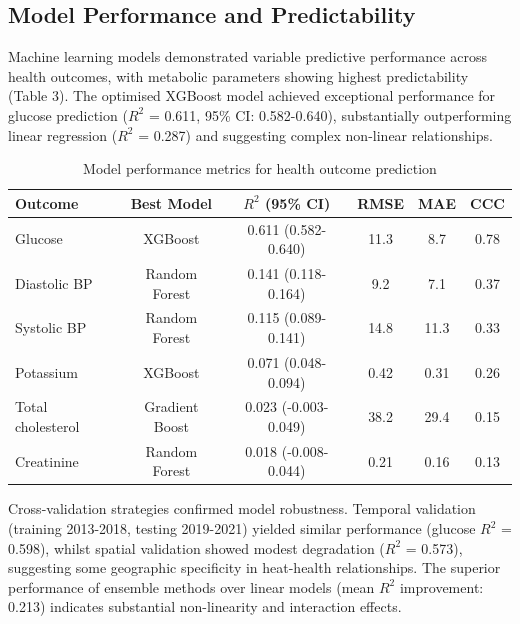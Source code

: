 \documentclass[11pt,a4paper]{article}
\begin{document}
\subsection{Model Performance and Predictability}

Machine learning models demonstrated variable predictive performance across health outcomes, with metabolic parameters showing highest predictability (Table 3). The optimised XGBoost model achieved exceptional performance for glucose prediction ($R^2$ = 0.611, 95\% CI: 0.582-0.640), substantially outperforming linear regression ($R^2$ = 0.287) and suggesting complex non-linear relationships.

\begin{table}[h!]
\centering
\caption{Model performance metrics for health outcome prediction}
\begin{tabular}{lccccc}
\toprule
\textbf{Outcome} & \textbf{Best Model} & \textbf{$R^2$ (95\% CI)} & \textbf{RMSE} & \textbf{MAE} & \textbf{CCC} \\
\midrule
Glucose & XGBoost & 0.611 (0.582-0.640) & 11.3 & 8.7 & 0.78 \\
Diastolic BP & Random Forest & 0.141 (0.118-0.164) & 9.2 & 7.1 & 0.37 \\
Systolic BP & Random Forest & 0.115 (0.089-0.141) & 14.8 & 11.3 & 0.33 \\
Potassium & XGBoost & 0.071 (0.048-0.094) & 0.42 & 0.31 & 0.26 \\
Total cholesterol & Gradient Boost & 0.023 (-0.003-0.049) & 38.2 & 29.4 & 0.15 \\
Creatinine & Random Forest & 0.018 (-0.008-0.044) & 0.21 & 0.16 & 0.13 \\
\bottomrule
\end{tabular}
\end{table}

Cross-validation strategies confirmed model robustness. Temporal validation (training 2013-2018, testing 2019-2021) yielded similar performance (glucose $R^2$ = 0.598), whilst spatial validation showed modest degradation ($R^2$ = 0.573), suggesting some geographic specificity in heat-health relationships. The superior performance of ensemble methods over linear models (mean $R^2$ improvement: 0.213) indicates substantial non-linearity and interaction effects.
\end{document}
